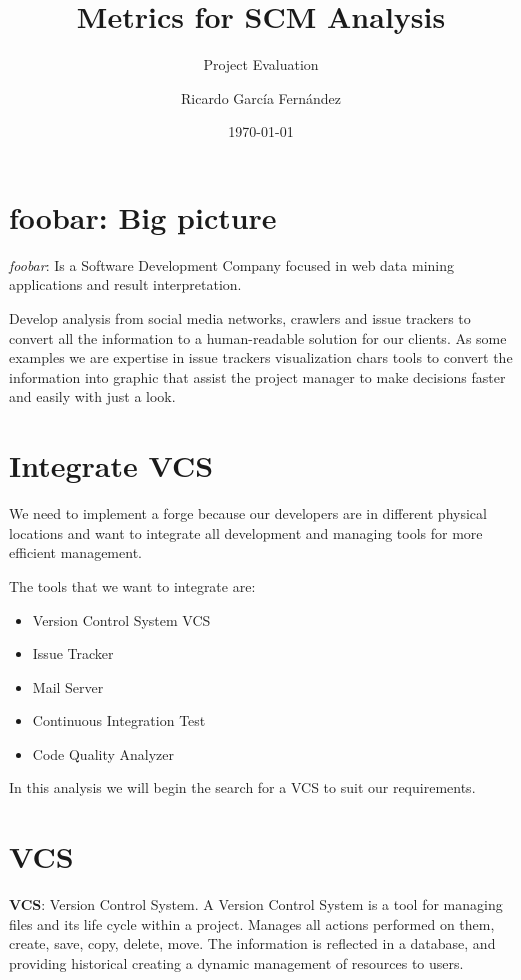 \documentclass[11pt]{scrartcl}
\title{\textbf{Metrics for SCM Analysis}}
\subtitle{Project Evaluation}
\author{Ricardo Garc\'ia Fern\'andez}
\date{\today}
\begin{document}
\maketitle

\tableofcontents

\newpage

\section{foobar: Big picture}

\emph{foobar}: Is a Software Development Company focused in web data mining applications and result interpretation.

\par Develop analysis from social media networks, crawlers and issue trackers to convert all the information to a human-readable solution for our clients. As some examples we are expertise in issue trackers visualization chars tools to convert the information into graphic that assist the project manager to make decisions faster and easily with just a look.

\section{Integrate VCS}

We need to implement a forge because our developers are in different physical locations and want to integrate all development and managing tools for more efficient management.

The tools that we want to integrate are:

\begin{itemize}
    \item Version Control System VCS
    \item Issue Tracker
    \item Mail Server
    \item Continuous Integration Test
    \item Code Quality Analyzer
\end{itemize}

In this analysis we will begin the search for a VCS to suit our requirements.

\section{VCS}

\par \textbf{VCS}: Version Control System. A Version Control System is a tool for managing files and its life cycle within a project. Manages all actions performed on them, create, save, copy, delete, move. The information is reflected in a database, and providing historical creating a dynamic management of resources to users.
\end{document}
